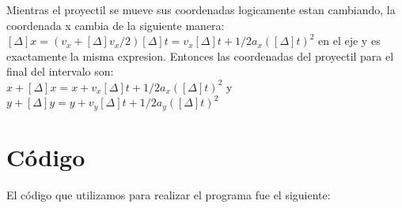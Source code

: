 \documentclass[10pt]{article}
\begin{document}
Mientras el proyectil se mueve sus coordenadas logicamente estan cambiando, la coordenada x cambia de la siguiente manera: $[\Delta]x=(v_{x}+[\Delta]v_{x}/2)[\Delta]t=v_{x}[\Delta]t+1/2a_{x}([\Delta]t)^2$ en el eje y es exactamente la misma expresion. Entonces las coordenadas del proyectil para el final del intervalo son: \\

$x+[\Delta]x=x+v_{x}[\Delta]t+1/2a_{x}([\Delta]t)^2$ y $y+[\Delta]y=y+v_{y}[\Delta]t+1/2a_{y}([\Delta]t)^2$\\ 

\section{Código}

El código que utilizamos para realizar el programa fue el siguiente:\\
\end{document}

